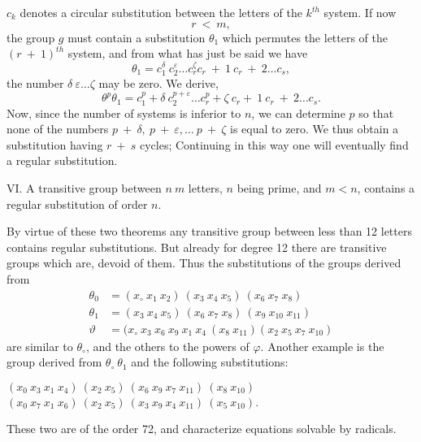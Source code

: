 \documentclass[11pt,fancy]{elegantbook}
\begin{document}
$c_k$ denotes a circular substitution between the letters of the $k^{th}$ system. If now 
\begin{equation}
    r \ < \ m,
\end{equation}
the group $g$ must contain a substitution $\theta_1$ which permutes the letters of the $(r \ + \ 1)^{th}$ system, and from what has just be said we have
\begin{equation}
    \theta_1=c_1^{\delta} \ c_2^{\varepsilon} \dots c_r^{\zeta}c_r \ + \ 1 \ c_r \ + \ 2 \dots c_s,
\end{equation}
the number $\delta \ \varepsilon \dots \zeta$ may be zero. We derive,
\begin{equation}
    \theta^p\theta_1=c_1^p + \delta \ c_2^{p+\varepsilon} \dots c_r^p + \zeta \ c_r + \ 1 \ c_r \ + \ 2 \dots c_s.
\end{equation}
Now, since the number of systems is inferior to $n$, we can determine $p$ so that none of the numbers $p \ + \ \delta, \ p \ + \ \varepsilon, \dots \ p \ + \ \zeta $ is equal to zero. We thus obtain a substitution having $r \ + \ s $ cycles; Continuing in this way one will eventually find a regular substitution.
\begin{theorem}
VI. A transitive group between $n \ m$ letters, $n$ being prime, and $m < n$, contains a regular substitution of order $n$.
\end{theorem}
By virtue of these two theorems any transitive group between less than 12 letters contains regular substitutions. But already for degree 12 there are transitive groups which are, devoid of them. Thus the substitutions of the groups derived from
\begin{equation}
    \begin{aligned}
        \theta_0&=(x_\circ \ x_1 \ x_2) \ (x_3 \ x_4 \ x_5) \ (x_6 \ x_7 \ x_8) \\
        \theta_1&=(x_3 \ x_4 \ x_5) \ (x_6 \ x_7 \ x_8) \ (x_9 \ x_{10} \ x_{11}) \\
        \vartheta&=(x_\circ \ x_3 \ x_6 \ x_9 \ x_1 \ x_4 \ (x_8 \ x_{11}) (x_2 \ x_5 \ x_7 \ x_{10})
    \end{aligned}
\end{equation}
are similar to $\theta_\circ$, and the others to the powers of $\varphi$. Another example is the group derived from $\theta_\circ \ \theta_1$ and the following substitutions:
\begin{center}
$(x_{0} \ x_{3} \ x_{1} \ x_{4}) \ (x_2 \ x_5) \ (x_6 \ x_9 \ x_7 \ x_{11}) \ (x_8 \ x_{10})$ \\
$(x_0 \ x_7 \ x_1 \ x_6) \ (x_{2} \ x_{5}) \ 
(x_3 \ x_9 \ x_4 \ x_{11}) \ 
(x_5 \ x_{10})$.
\end{center}
These two are of the order 72, and characterize equations solvable by radicals.
\end{document}
